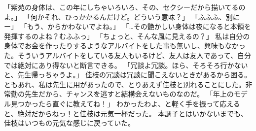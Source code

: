 「紫苑の身体は、この年にしちゃいろいろ、その、セクシーだから描いてるのよ。」
「何かそれ、ひっかかるんだけど。どういう意味？」
「ふふふ、別にー」
「もう、からかわないでよね。」
「…その艶かしい身体は夜になると本領を発揮するのよね？むふふっ」
「ちょっと、そんな風に見えるの？」
私は自分の身体でお金を作ったりするようなアルバイトをした事も無いし、興味もなかった。そういうアルバイトをしている友人もいるけど、友人は友人であって、自分では絶対にあり得ないと断言できる。
「冗談よ冗談。ほら、そろそろ行かないと、先生帰っちゃうよ。」
佳枝の冗談は冗談に聞こえないときがあるから困る。ともあれ、私は先生に用があったので、とりあえず佳枝と別れることにした。非常勤の先生だから、チャンスを逃すと結構会えないものなのだ。
「年上のモデル見つかったら直ぐに教えてね！」
わかったわよ、と軽く手を振って応えると、絶対だからねっ！と佳枝は元気一杯だった。
本調子とはいかないまでも、佳枝はいつもの元気な感じに戻っていた。


